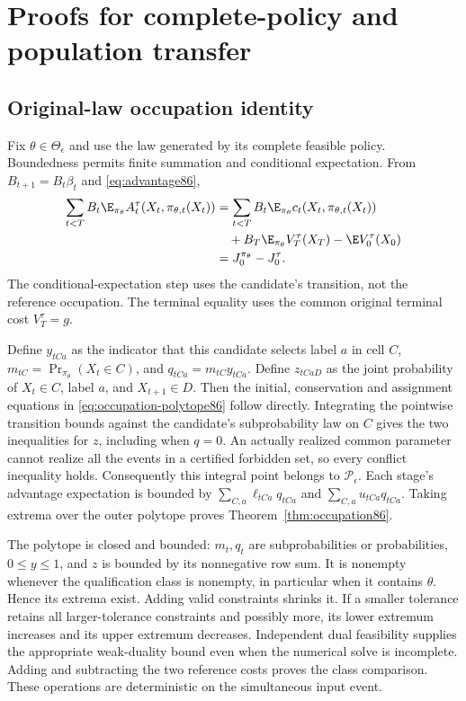 \section{Proofs for complete-policy and population transfer}\label{supp:occupation86}
\subsection{Original-law occupation identity}
Fix $\theta\in\Theta_\epsilon$ and use the law generated by its complete feasible policy. Boundedness permits finite summation and conditional expectation. From $B_{t+1}=B_t\beta_t$ and \eqref{eq:advantage86},
\begin{align*}
 \sum_{t<T}B_t\E_{\pi_\theta}A_t^\tau(X_t,\pi_{\theta,t}(X_t))
 &=\sum_{t<T}B_t\E_{\pi_\theta}c_t(X_t,\pi_{\theta,t}(X_t))\\
 &\quad+B_T\E_{\pi_\theta}V_T^\tau(X_T)-\E V_0^\tau(X_0)\\
 &=J_0^{\pi_\theta}-J_0^\tau.
\end{align*}
The conditional-expectation step uses the candidate's transition, not the reference occupation. The terminal equality uses the common original terminal cost $V_T^\tau=g$.

Define $y_{tCa}$ as the indicator that this candidate selects label $a$ in cell $C$, $m_{tC}=\Pr_{\pi_\theta}(X_t\in C)$, and $q_{tCa}=m_{tC}y_{tCa}$. Define $z_{tCaD}$ as the joint probability of $X_t\in C$, label $a$, and $X_{t+1}\in D$. Then the initial, conservation and assignment equations in \eqref{eq:occupation-polytope86} follow directly. Integrating the pointwise transition bounds against the candidate's subprobability law on $C$ gives the two inequalities for $z$, including when $q=0$. An actually realized common parameter cannot realize all the events in a certified forbidden set, so every conflict inequality holds. Consequently this integral point belongs to $\mathcal P_\epsilon$. Each stage's advantage expectation is bounded by $\sum_{C,a}\ell_{tCa}q_{tCa}$ and $\sum_{C,a}u_{tCa}q_{tCa}$. Taking extrema over the outer polytope proves Theorem~\ref{thm:occupation86}.

The polytope is closed and bounded: $m_t,q_t$ are subprobabilities or probabilities, $0\le y\le1$, and $z$ is bounded by its nonnegative row sum. It is nonempty whenever the qualification class is nonempty, in particular when it contains $\widehat\theta$. Hence its extrema exist. Adding valid constraints shrinks it. If a smaller tolerance retains all larger-tolerance constraints and possibly more, its lower extremum increases and its upper extremum decreases. Independent dual feasibility supplies the appropriate weak-duality bound even when the numerical solve is incomplete. Adding and subtracting the two reference costs proves the class comparison. These operations are deterministic on the simultaneous input event.

